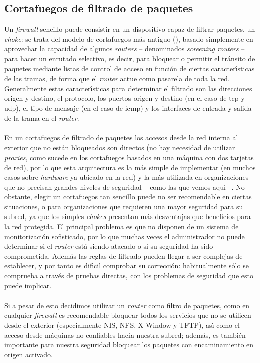 \subsection{Cortafuegos de filtrado de paquetes}
Un {\it firewall} sencillo puede consistir en un dispositivo capaz de filtrar
paquetes, un {\it choke}: se trata del modelo de cortafuegos m\'as antiguo 
(\cite{kn:sch97}), basado simplemente en aprovechar la capacidad de algunos 
{\it routers} -- denominados {\it screening routers} -- para hacer un enrutado 
selectivo, es decir, para bloquear o permitir el tr\'ansito de paquetes mediante
listas de control de acceso en funci\'on de ciertas caracter\'{\i}sticas de las 
tramas, de forma que el {\it router} actue como pasarela de toda la red. 
Generalmente estas 
caracter\'{\i}sticas para determinar el filtrado son las direcciones origen y 
destino, el protocolo, los puertos origen y destino (en el caso de {\sc tcp} y 
{\sc udp}), el tipo de mensaje (en el caso de {\sc icmp}) y los interfaces de 
entrada y salida de la trama en el {\it router}.\\ 
\\En un cortafuegos de filtrado de paquetes los accesos desde la red interna al 
exterior que no est\'an bloqueados son directos (no hay necesidad de utilizar 
{\it proxies}, como sucede en los cortafuegos basados en una m\'aquina con dos 
tarjetas de red), por lo que esta arquitectura es la m\'as simple de 
implementar (en muchos casos sobre {\it hardware} ya ubicado en la red) y la 
m\'as utilizada en organizaciones que no precisan grandes niveles de seguridad 
-- como las que vemos aqu\'{\i} --. No obstante, elegir un cortafuegos tan 
sencillo puede no ser recomendable 
en ciertas situaciones, o para organizaciones que requieren una mayor seguridad
para su subred, ya que los simples {\it chokes} presentan m\'as desventajas que
beneficios para la red protegida. El principal problema es que no disponen de 
un sistema de monitorizaci\'on sofisticado, por lo que muchas veces el 
administrador no puede determinar si el {\it router} est\'a siendo atacado o si 
su seguridad ha sido comprometida. Adem\'as las reglas de filtrado pueden llegar
a ser complejas de establecer, y por tanto es dif\'{\i}cil comprobar su 
correcci\'on: habitualmente s\'olo se comprueba a trav\'es de pruebas directas, 
con los problemas de seguridad que esto puede implicar.\\ 
\\Si a pesar de esto decidimos utilizar un {\it router} como filtro de 
paquetes, como en cualquier {\it firewall} es recomendable bloquear todos los 
servicios que no se utilicen desde 
el exterior (especialmente NIS, NFS, X-Window y TFTP), as\'{\i} como el acceso
desde m\'aquinas no confiables hacia nuestra subred; adem\'as, es tambi\'en 
importante para nuestra seguridad bloquear los paquetes con encaminamiento en 
origen activado.
